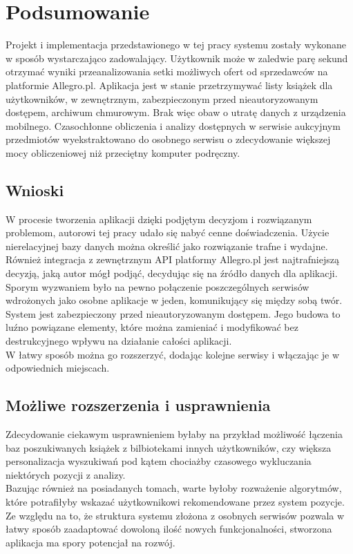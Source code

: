 \chapter{Podsumowanie}
\label{cha:podsumowanie}

Projekt i implementacja przedstawionego w tej pracy systemu zostały wykonane w sposób wystarczająco zadowalający. Użytkownik może w zaledwie parę sekund otrzymać wyniki przeanalizowania setki możliwych ofert od sprzedawców na platformie Allegro.pl. Aplikacja jest w stanie przetrzymywać listy książek dla użytkowników, w zewnętrznym, zabezpieczonym przed nieautoryzowanym dostępem, archiwum chmurowym. Brak więc obaw o utratę danych z urządzenia mobilnego. Czasochłonne obliczenia i analizy dostępnych w serwisie aukcyjnym przedmiotów wyekstraktowano do osobnego serwisu o zdecydowanie większej mocy obliczeniowej niż przeciętny komputer podręczny.

\section{Wnioski}
W procesie tworzenia aplikacji dzięki podjętym decyzjom i rozwiązanym problemom, autorowi tej pracy udało się nabyć cenne doświadczenia. 
Użycie nierelacyjnej bazy danych można określić jako rozwiązanie trafne i wydajne. Również integracja z zewnętrznym API platformy Allegro.pl jest najtrafniejszą decyzją, jaką autor mógł podjąć, decydując się na źródło danych dla aplikacji.
Sporym wyzwaniem było na pewno połączenie poszczególnych serwisów wdrożonych jako osobne aplikacje w jeden, komunikujący się między sobą twór.
System jest zabezpieczony przed nieautoryzowanym dostępem. Jego budowa to luźno powiązane elementy, które można zamieniać i modyfikować bez destrukcyjnego wpływu na działanie całości aplikacji.\\
W łatwy sposób można go rozszerzyć, dodając kolejne serwisy i włączając je w odpowiednich miejscach.

\newpage
\section{Możliwe rozszerzenia i usprawnienia}
Zdecydowanie ciekawym usprawnieniem byłaby na przykład możliwość łączenia baz poszukiwanych książek z bilbiotekami innych użytkowników, czy większa personalizacja wyszukiwań pod kątem chociażby czasowego wykluczania niektórych pozycji z analizy.\\
Bazując również na posiadanych tomach, warte byłoby rozważenie algorytmów, które potrafiłyby wskazać użytkownikowi rekomendowane przez system pozycje.\\
Ze względu na to, że struktura systemu złożona z osobnych serwisów pozwala w łatwy sposób zaadaptować dowoloną ilość nowych funkcjonalności, stworzona aplikacja ma spory potencjał na rozwój.